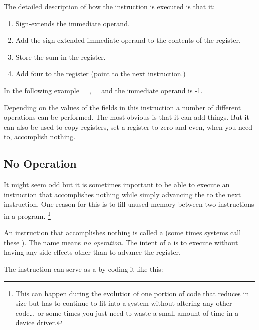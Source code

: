 %
The detailed description of how the  instruction is executed
is that it:
\begin{enumerate}
\item Sign-extends the immediate operand.
\item Add the sign-extended immediate operand to the contents of the  register.
\item Store the sum in the  register.
\item Add four to the  register (point to the next instruction.)
\end{enumerate}

In the following example  = ,  =  and
the immediate operand is -1.


Depending on the values of the fields in this instruction a number of
different operations can be performed.  The most obvious is that it
can add things.  But it can also be used to copy registers, set a 
register to zero and even, when you need to, accomplish nothing.

\subsection{No Operation}

It might seem odd but it is sometimes important to be able to execute
an instruction that accomplishes nothing while simply advancing the 
 to the next instruction.  One reason for this is to fill 
unused memory between two instructions in a program.%
\footnote{This can happen during the evolution of one portion of code 
that reduces in size but has to continue to fit into a system without 
altering any other code\ldots\ or some times you just need to waste 
a small amount of time in a device driver.}

An instruction that accomplishes nothing is called a 
(some times systems call these ).  The name means 
{\em no operation}.  
The intent of a  is to execute without having any side effects 
other than to advance the  register.

The  instruction can serve as a  by coding it like this:

